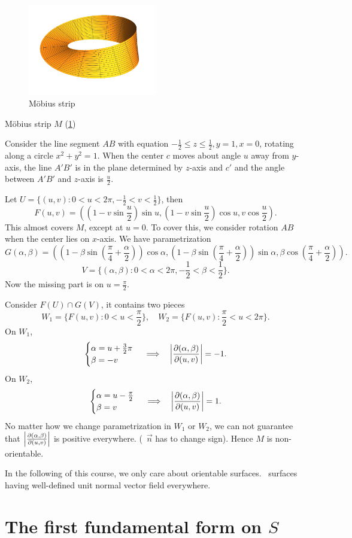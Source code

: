 \begin{figure}[htb]
    \centering
    \includegraphics[width=0.5\textwidth]{picture/week6/mobius.pdf}
    \caption{M\"obius strip}\label{fig:mobius}
\end{figure}

\begin{example}
    M\"obius strip \(M\) (\cref{fig:mobius})
\end{example}

Consider the line segment \(AB\) with equation \(-\frac{1}{2}\le z\le \frac{1}{2},
y=1,x=0\), rotating along a circle \(x^2+y^2=1\). When the center \(c\) moves
about angle \(u\) away from \(y\)-axis, the line \(A'B'\) is in the plane determined
by \(z\)-axis and \(c'\) and the angle between \(A'B'\) and \(z\)-axis is
\(\frac{u}{2}\).

Let \(U=\{(u,v):0<u<2\pi,-\frac{1}{2}<v<\frac{1}{2}\}\), then \[
    F(u,v)=((1-v\sin\frac{u}{2})\sin u,(1-v\sin \frac{u}{2})\cos u,v\cos\frac{u}{2})
.\] This almost covers \(M\), except at \(u=0\). To cover this, we consider
rotation \(AB\) when the center lies on \(x\)-axis. We have parametrization \[
    G(\alpha,\beta)=((1-\beta\sin(\frac{\pi}{4}+\frac{\alpha}{2}))\cos\alpha,
    (1-\beta\sin(\frac{\pi}{4}+\frac{\alpha}{2}))\sin\alpha,
    \beta\cos(\frac{\pi}{4}+\frac{\alpha}{2}))
.\] \[
    V=\{(\alpha,\beta):0<\alpha<2\pi,-\frac{1}{2}<\beta<\frac{1}{2}\}
.\] Now the missing part is on \(u=\frac{\pi}{2}\).

Consider \(F(U)\cap G(V)\), it contains two pieces \[
    W_1=\{F(u,v):0<u<\frac{\pi}{2}\},\quad
    W_2=\{F(u,v):\frac{\pi}{2}<u<2\pi\}
.\] On \(W_1\), \[
    \begin{cases}
        \alpha=u+\frac{3}{2}\pi \\
        \beta=-v
    \end{cases}
    \implies \ \ \left|\pdv{(\alpha,\beta)}{(u,v)}\right|=-1
.\] On \(W_2\), \[
    \begin{cases}
        \alpha=u-\frac{\pi}{2} \\
        \beta=v
    \end{cases}
    \implies \ \ \left|\pdv{(\alpha,\beta)}{(u,v)}\right|=1
.\] No matter how we change parametrization in \(W_1\) or \(W_2\), we can not
guarantee that \(\left|\pdv{(\alpha,\beta)}{(u,v)}\right|\) is positive everywhere.
(\ie\ \(\vec{n}\) has to change sign). Hence \(M\) is non-orientable.

\begin{remark}
    In the following of this course, we only care about orientable surfaces.
    \ie\ surfaces having well-defined unit normal vector field everywhere.
\end{remark}

\section{The first fundamental form on \(S\)}

